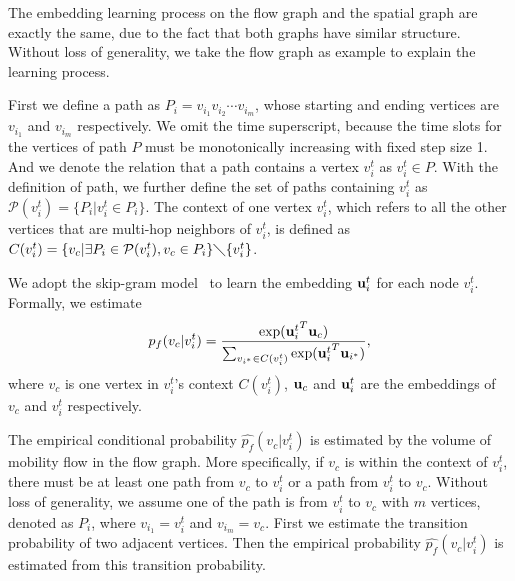 The embedding learning process on the flow graph and the spatial graph are exactly the same, due to the fact that both graphs have similar structure. Without loss of generality, we take the flow graph as example to explain the learning process.


First we define a path as $P_i = v_{i_1} v_{i_2} \cdots v_{i_m}$, whose starting and ending vertices are $v_{i_1}$ and $v_{i_m}$ respectively. We omit the time superscript, because the time slots for the vertices of path $P$ must be monotonically increasing with fixed step size 1. And we denote the relation that a path contains a vertex $v_i^t$ as $v_i^t \in P$. With the definition of path, we further define the set of paths containing $v_i^t$ as $\mathcal{P}(v_i^t) = \{ P_i | v_i^t \in P_i \}$. The context of one vertex $v_i^t$, which refers to all the other vertices that are multi-hop neighbors of $v_i^t$, is defined as $C(v_i^t) = \{ v_c |  \exists P_i \in \mathcal{P}(v_i^t),  v_c \in P_i \} \diagdown \{v_i^t\} $.


We adopt the skip-gram model~\cite{mikolov2013efficient} to learn the embedding $\mathbf{u}_i^t$ for each node $v_i^t$.  Formally, we estimate
\begin{equation}
\label{eq:cp_real}
p_f(v_c | v_i^t) = \frac{\exp({\mathbf{u}_i^t}^T \mathbf{u}_c)}{\sum_{v_{i^*} \in C(v_i^t)} \exp({\mathbf{u}_i^t}^T \mathbf{u}_{i^*})},
\end{equation}
where $v_c$ is one vertex in $v_i^t$'s context $C(v_i^t)$, $\mathbf{u}_c$ and $\mathbf{u}_i^t$ are the embeddings of $v_c$ and $v_i^t$ respectively.


The empirical conditional probability $\hat{p_f}(v_c | v_i^t)$ is estimated by the volume of mobility flow in the flow graph. More specifically, if $v_c$ is within the context of $v_i^t$, there must be at least one path from $v_c$ to $v_i^t$ or a path from $v_i^t$ to $v_c$. Without loss of generality, we assume one of the path is from $v_i^t$ to $v_c$ with $m$ vertices, denoted as $P_i$, where $v_{i_1} = v_i^t$ and $v_{i_m} = v_c$. First we estimate the transition probability of two adjacent vertices. Then the empirical probability $\hat{p_f}(v_c | v_i^t)$ is estimated from this transition probability.

